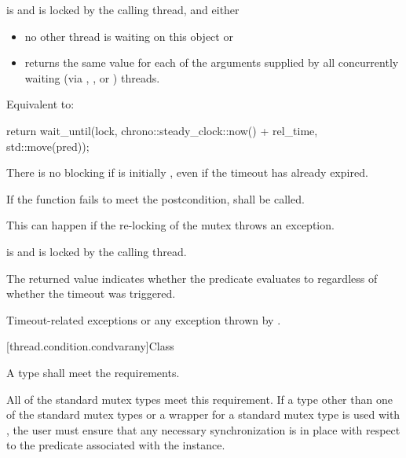 \begin{itemdescr}
\pnum
\requires {} is  and 
is locked by the calling thread, and either
\begin{itemize}
\item
no other thread is waiting on this  object or

\item
{} returns the same value for each of the  arguments
supplied by all concurrently waiting (via , , or
) threads.
\end{itemize}

\pnum
\effects Equivalent to:
\begin{codeblock}
return wait_until(lock, chrono::steady_clock::now() + rel_time, std::move(pred));
\end{codeblock}

\pnum
\begin{note} There is no blocking if  is initially , even if the
timeout has already expired. \end{note}

\pnum
\remarks
If the function fails to meet the postcondition, 
shall be called.
\begin{note} This can happen if the re-locking of the mutex throws an exception. \end{note}

\pnum
\postconditions {} is  and 
is locked by the calling thread.

\pnum
\begin{note} The returned value indicates whether the predicate evaluates to 
regardless of whether the timeout was triggered. \end{note}

\pnum
\throws Timeout-related
exceptions or any exception thrown by .

\end{itemdescr}

[thread.condition.condvarany]{Class }

\pnum
A  type shall meet the 
requirements. \begin{note} All of the standard
mutex types meet this requirement. If a  type other than one of the
standard mutex types or a  wrapper for a standard mutex type
is used with , the user must ensure that any
necessary synchronization is in place with respect to the predicate associated
with the  instance. \end{note}

